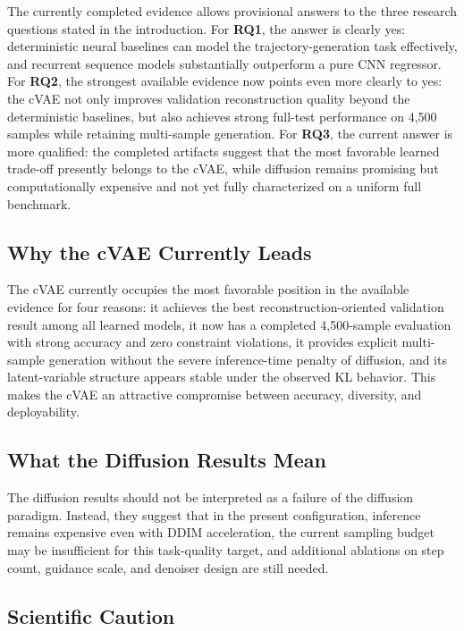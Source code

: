 \documentclass[11pt]{article}
\begin{document}
The currently completed evidence allows provisional answers to the three research questions stated in the introduction. For \textbf{RQ1}, the answer is clearly yes: deterministic neural baselines can model the trajectory-generation task effectively, and recurrent sequence models substantially outperform a pure CNN regressor. For \textbf{RQ2}, the strongest available evidence now points even more clearly to yes: the cVAE not only improves validation reconstruction quality beyond the deterministic baselines, but also achieves strong full-test performance on 4,500 samples while retaining multi-sample generation. For \textbf{RQ3}, the current answer is more qualified: the completed artifacts suggest that the most favorable learned trade-off presently belongs to the cVAE, while diffusion remains promising but computationally expensive and not yet fully characterized on a uniform full benchmark.

\subsection{Why the cVAE Currently Leads}

The cVAE currently occupies the most favorable position in the available evidence for four reasons: it achieves the best reconstruction-oriented validation result among all learned models, it now has a completed 4,500-sample evaluation with strong accuracy and zero constraint violations, it provides explicit multi-sample generation without the severe inference-time penalty of diffusion, and its latent-variable structure appears stable under the observed KL behavior. This makes the cVAE an attractive compromise between accuracy, diversity, and deployability.

\subsection{What the Diffusion Results Mean}

The diffusion results should not be interpreted as a failure of the diffusion paradigm. Instead, they suggest that in the present configuration, inference remains expensive even with DDIM acceleration, the current sampling budget may be insufficient for this task-quality target, and additional ablations on step count, guidance scale, and denoiser design are still needed.

\subsection{Scientific Caution}
\end{document}
